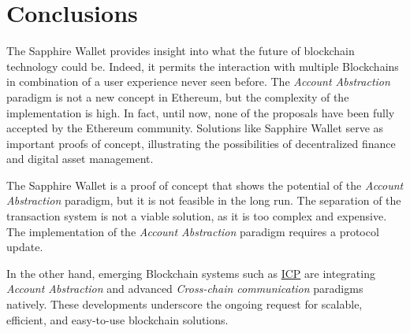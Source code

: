 \chapter{Conclusions}
\label{sec:conclusions}

The Sapphire Wallet provides insight into what the future of blockchain technology could be. Indeed, it permits the interaction with multiple Blockchains in combination of a user experience never seen before. The \textit{Account Abstraction} paradigm is not a new concept in Ethereum, but the complexity of the implementation is high. In fact, until now, none of the proposals have been fully accepted by the Ethereum community. Solutions like Sapphire Wallet serve as important proofs of concept, illustrating the possibilities of decentralized finance and digital asset management.

The Sapphire Wallet is a proof of concept that shows the potential of the \textit{Account Abstraction} paradigm, but it is not feasible in the long run. The separation of the transaction system is not a viable solution, as it is too complex and expensive. The implementation of the \textit{Account Abstraction} paradigm requires a protocol update.


In the other hand, emerging Blockchain systems such as \hyperref[sec:icp]{ICP} are integrating \textit{Account Abstraction} and advanced \textit{Cross-chain communication} paradigms natively. These developments underscore the ongoing request for scalable, efficient, and easy-to-use blockchain solutions. 